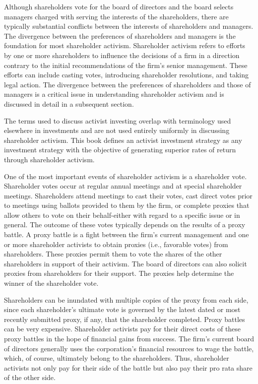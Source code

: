 \documentclass[11pt]{article}
\begin{document}
Although shareholders vote for the board of directors and the board selects managers charged with serving the interests of the shareholders, there are typically substantial conflicts between the interests of shareholders and managers. The divergence between the preferences of shareholders and managers is the foundation for most shareholder activism. Shareholder activism refers to efforts by one or more shareholders to influence the decisions of a firm in a direction contrary to the initial recommendations of the firm's senior management. These efforts can include casting votes, introducing shareholder resolutions, and taking legal action. The divergence between the preferences of shareholders and those of managers is a critical issue in understanding shareholder activism and is discussed in detail in a subsequent section.

The terms used to discuss activist investing overlap with terminology used elsewhere in investments and are not used entirely uniformly in discussing shareholder activism. This book defines an activist investment strategy as any investment strategy with the objective of generating superior rates of return through shareholder activism.

One of the most important events of shareholder activism is a shareholder vote. Shareholder votes occur at regular annual meetings and at special shareholder meetings. Shareholders attend meetings to cast their votes, cast direct votes prior to meetings using ballots provided to them by the firm, or complete proxies that allow others to vote on their behalf-either with regard to a specific issue or in general. The outcome of these votes typically depends on the results of a proxy battle. A proxy battle is a fight between the firm's current management and one or more shareholder activists to obtain proxies (i.e., favorable votes) from shareholders. These proxies permit them to vote the shares of the other shareholders in support of their activism. The board of directors can also solicit proxies from shareholders for their support. The proxies help determine the winner of the shareholder vote.

Shareholders can be inundated with multiple copies of the proxy from each side, since each shareholder's ultimate vote is governed by the latest dated or most recently submitted proxy, if any, that the shareholder completed. Proxy battles can be very expensive. Shareholder activists pay for their direct costs of these proxy battles in the hope of financial gains from success. The firm's current board of directors generally uses the corporation's financial resources to wage the battle, which, of course, ultimately belong to the shareholders. Thus, shareholder activists not only pay for their side of the battle but also pay their pro rata share of the other side.
\end{document}
